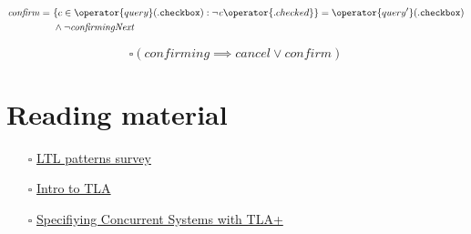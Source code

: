 \documentclass[11pt]{article}
\begin{document}
\begin{equation}
\label{eq:orgafeed49}
\begin{aligned}
\mathit{confirm} =\ & \{c \in \operator{query}(\mathtt{.checkbox}) : \lnot \mathit{c}\operator{.checked} \} = \operator{query'}(\mathtt{.checkbox}) \\
  & \wedge \lnot \mathit{confirmingNext} \\
\end{aligned}
\end{equation}

\begin{equation}
\label{eq:org06a2200}
\square (\mathit{confirming} \implies \mathit{cancel} \vee \mathit{confirm})
\end{equation}


\section{Reading material}
\label{sec:orgd1f45d9}

\begin{itemize}
\item[{$\square$}] \href{http://santos.cs.ksu.edu/esscass04/papers/patterns-survey.pdf}{LTL patterns survey}
\item[{$\square$}] \href{https://lamport.azurewebsites.net/pubs/intro-to-tla.pdf}{Intro to TLA}
\item[{$\square$}] \href{https://www.microsoft.com/en-us/research/uploads/prod/2016/12/Specifying-Concurrent-Systems-with-TLA.pdf}{Specifiying Concurrent Systems with TLA+}
\end{itemize}
\end{document}
